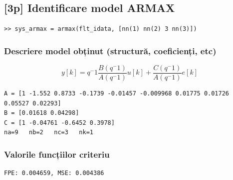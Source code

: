 \documentclass[12pt,english]{article}
\begin{document}
\subsection {[3p] Identificare model ARMAX }
\begin{lstlisting}
>> sys_armax = armax(flt_idata, [nn(1) nn(2) 3 nn(3)])
\end{lstlisting}
\subsubsection {Descriere model obținut (structură, coeficienți, etc) }
\[ y[k] = q^-1 \dfrac{B(q^-1)}{A(q^-1)}u[k] + \dfrac{C(q^-1)}{A(q^-1)}e[k] \]

\begin{lstlisting}
A = [1 -1.552 0.8733 -0.1739 -0.01457 -0.009968 0.01775 0.01726 0.05527 0.02293]
B = [0.01618 0.04298]
C = [1 -0.04761 -0.6452 0.3978]
na=9   nb=2   nc=3   nk=1
\end{lstlisting}
\subsubsection {Valorile funcțiilor criteriu }
\begin{lstlisting}
FPE: 0.004659, MSE: 0.004386
\end{lstlisting}
\end{document}
